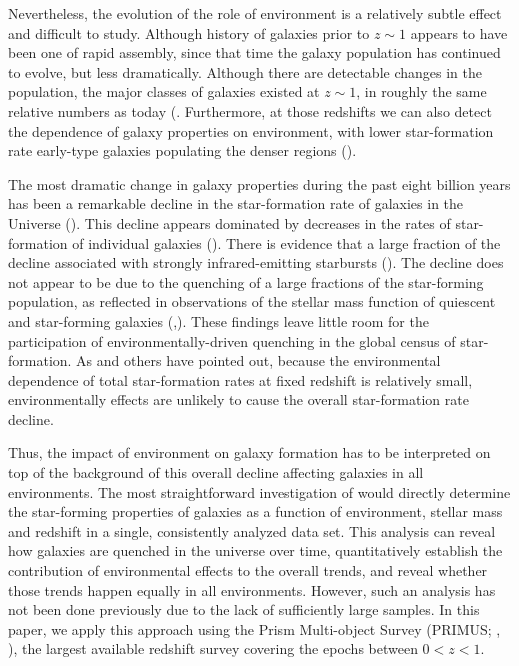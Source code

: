 \documentclass{emulateapj}
\begin{document}
Nevertheless, the evolution of the role of environment is a relatively
subtle effect and difficult to study.  Although history of galaxies
prior to $z\sim 1$ appears to have been one of rapid assembly, since
that time the galaxy population has continued to evolve, but less
dramatically. Although there are detectable changes in the population,
the major classes of galaxies existed at $z\sim 1$, in roughly the
same relative numbers as today (\citealt{bundy06a, borch06a,
taylor09a, moustakas13a}. Furthermore, at those redshifts we can also
detect the dependence of galaxy properties on environment, with lower
star-formation rate early-type galaxies populating the denser regions
(\citealt{cooper08a, patel09a, kovac10a}).

The most dramatic change in galaxy properties during the past eight
billion years has been a remarkable decline in the star-formation rate
of galaxies in the Universe (\citealt{hopkins06a}).  This decline
appears dominated by decreases in the rates of star-formation of
individual galaxies (\cite{Noeske:2007aa}). There is evidence that a
large fraction of the decline associated with strongly
infrared-emitting starbursts (\citealt{bell05a, magnelli09a}).  The
decline does not appear to be due to the quenching of a large
fractions of the star-forming population, as reflected in observations
of the stellar mass function of quiescent and star-forming galaxies
(\cite{Blanton:2006aa},\citealt{bundy06a, borch06a, moustakas13a}).  These
findings leave little room for the participation of
environmentally-driven quenching in the global census of
star-formation.  As \citet{cooper08a} and others have pointed out,
because the environmental dependence of total star-formation rates at
fixed redshift is relatively small, environmentally effects are
unlikely to cause the overall star-formation rate decline.

Thus, the impact of environment on galaxy formation has to be
interpreted on top of the background of this overall decline affecting
galaxies in all environments.  The most straightforward investigation
of would directly determine the star-forming properties of galaxies as
a function of environment, stellar mass and redshift in a single,
consistently analyzed data set. This analysis can reveal how galaxies
are quenched in the universe over time, quantitatively establish the
contribution of environmental effects to the overall trends, and
reveal whether those trends happen equally in all environments.
However, such an analysis has not been done previously due to the lack
of sufficiently large samples. In this paper, we apply this approach
using the Prism Multi-object Survey (PRIMUS; \cite{Coil:2011aa}, 
\cite{Cool:2013aa}), the largest available redshift survey covering the epochs
between $0<z<1$.
\end{document}
